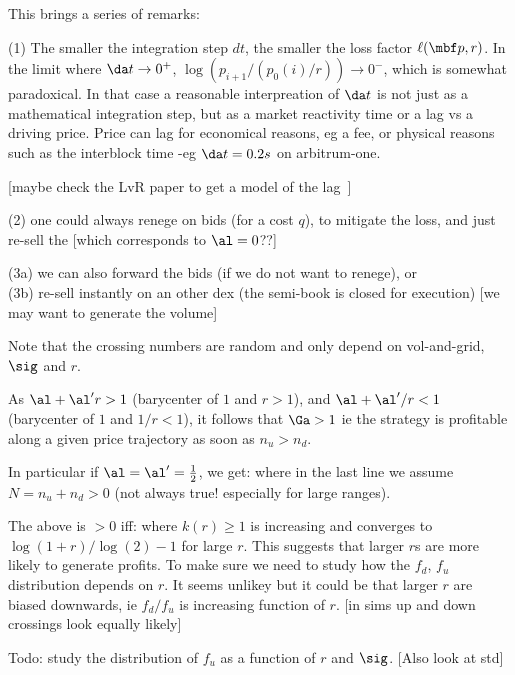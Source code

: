 \documentclass[oneside,twocolumn,12pt]{article}
\begin{document}
This brings a series of remarks:

(1) The smaller the integration step $dt$, the smaller the loss factor $\ell(\mbf p, r)$.
In the limit where $\da t\to0^+$, $\log(p_{i+1}/(p_0(i)/r))\to 0^-$, which is somewhat paradoxical.
In that case a reasonable interpreation of $\da t$ is not just as a mathematical integration step,
but as a market reactivity time or a lag vs a driving price. Price can lag for economical reasons,
eg a fee, or physical reasons such as the interblock time -eg $\da t=0.2 s$ on arbitrum-one.

[maybe check the LvR paper to get a model of the lag~\cite{milionis2022automated,alexander2024impermanent}]

(2) one could always renege on bids (for a cost $q$), to mitigate the loss, 
and just re-sell the [which corresponds to $\al=0$??]

(3a) we can also forward the bids (if we do not want to renege), or 
\\(3b) re-sell instantly on an other dex (the semi-book is closed for execution) 
[we may want to generate the volume]

Note that the crossing numbers are random and only depend on vol-and-grid, $\sig$ and $r$.

As
$\al+\al' r>1$ (barycenter of $1$ and $r>1$), and  
$\al+\al'/r<1$ (barycenter of $1$ and $1/r<1$),
it follows that $\Ga>1$ ie the strategy is profitable along a given price trajectory as soon as $n_u>n_d$.

In particular if $\al=\al'=\frac12$, we get:
where in the last line we assume $N=n_u+n_d>0$ (not always true! especially for large ranges).

The above is $>0$ iff:
where $k(r)\geq 1$ is increasing and converges to $\log(1+r)/\log(2) -1$ for large $r$.
This suggests that  larger $r$s are more likely to generate profits. To make sure we need
to study how the $f_d$, $f_u$ distribution depends on $r$. It seems unlikey but it could be that larger $r$ are biased 
downwards, ie $f_d/f_u$ is increasing function of $r$. [in sims up and down crossings 
look equally likely]

Todo: study the distribution of $f_u$ as a function of $r$ and $\sig$. [Also look at std]
\end{document}
